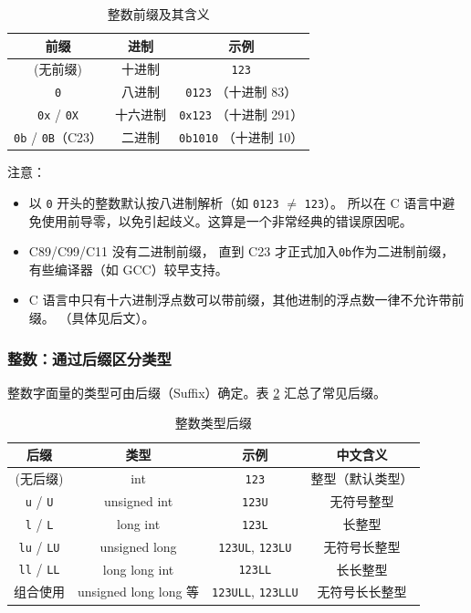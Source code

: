 \begin{table}[h!]
\centering
\caption{整数前缀及其含义}\label{tab:int-prefix}
\begin{tabular}{c|c|c}
\hline
前缀 & 进制 & 示例 \\ \hline
(无前缀) & 十进制 & \verb|123| \\
\verb|0| & 八进制 & \verb|0123| （十进制 83）\\
\verb|0x| / \verb|0X| & 十六进制 & \verb|0x123| （十进制 291）\\
\verb|0b| / \verb|0B|（C23） & 二进制 & \verb|0b1010| （十进制 10）\\
\hline
\end{tabular}
\end{table}


注意：
\begin{itemize}
    \item 以 \texttt{0} 开头的整数默认按八进制解析（如 \texttt{0123} $\neq$ \texttt{123}）。
    所以在 C 语言中避免使用前导零，以免引起歧义。这算是一个非常经典的错误原因呢。
    \item  C89/C99/C11 没有二进制前缀， 直到 C23 才正式加入\texttt{0b}作为二进制前缀，
    有些编译器（如 GCC）较早支持。
    \item C 语言中只有十六进制浮点数可以带前缀，其他进制的浮点数一律不允许带前缀。
    （具体见后文）。
\end{itemize}


 
\subsubsection{整数：通过后缀区分类型}



整数字面量的类型可由后缀（Suffix）确定。表 \ref{tab:int-suffix} 汇总了常见后缀。

\begin{table}[h]
\centering
\caption{整数类型后缀}\label{tab:int-suffix}
\begin{tabular}{cccc}
\hline
后缀 & 类型 & 示例 & 中文含义 \\ \hline
(无后缀) & int & \verb|123| & 整型（默认类型） \\

\verb|u| / \verb|U| & unsigned int & \verb|123U| & 无符号整型 \\

\verb|l| / \verb|L| & long int & \verb|123L| & 长整型 \\

\verb|lu| / \verb|LU| & unsigned long & \verb|123UL|, \verb|123LU| & 无符号长整型 \\

\verb|ll| / \verb|LL| & long long int & \verb|123LL| & 长长整型 \\

组合使用 & unsigned long long 等 & \verb|123ULL|, \verb|123LLU| & 无符号长长整型 \\ \hline
\end{tabular}
\end{table}



